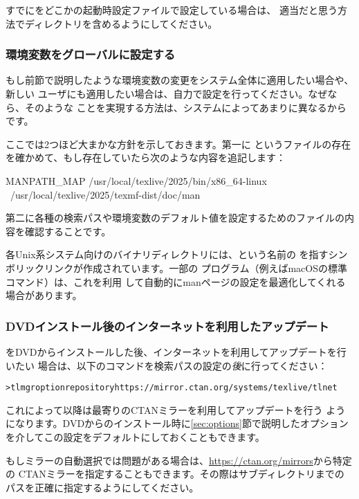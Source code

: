 \documentclass[uplatex,dvipdfmx,12pt,tombow]{jsarticle}
\begin{document}
すでにをどこかの起動時設定ファイルで設定している場合は、
適当だと思う方法で\TL ディレクトリを含めるようにしてください。

\subsubsection{環境変数をグローバルに設定する}
\label{sec:envglobal}

もし前節で説明したような環境変数の変更をシステム全体に適用したい場合や、新しい
ユーザにも適用したい場合は、自力で設定を行ってください。なぜなら、そのような
ことを実現する方法は、システムによってあまりに異なるからです。

ここでは2つほど大まかな方針を示しておきます。第一に%
というファイルの存在を確かめて、もし存在していたら次のような内容を追記します：
%
\begin{sverbatim}
MANPATH_MAP /usr/local/texlive/2025/bin/x86_64-linux \
            /usr/local/texlive/2025/texmf-dist/doc/man
\end{sverbatim}
%
第二に各種の検索パスや環境変数のデフォルト値を設定するためのファイルの内容を確認することです。

各Unix系システム向けのバイナリディレクトリには、という名前の
を指すシンボリックリンクが作成されています。一部の
プログラム（例えばmacOSの標準コマンド）は、これを利用
して自動的にmanページの設定を最適化してくれる場合があります。

\subsubsection{DVDインストール後のインターネットを利用したアップデート}
\label{sec:dvd-install-net-updates}

\TL をDVDからインストールした後、インターネットを利用してアップデートを行いたい
場合は、以下のコマンドを検索パスの設定の\emph{後}に行ってください：
%
\begin{alltt}
> tlmgr option repository https://mirror.ctan.org/systems/texlive/tlnet
\end{alltt}
%
これによって以降は最寄りのCTANミラーを利用してアップデートを行う
ようになります。DVDからのインストール時に\ref{sec:options}節で説明したオプション
を介してこの設定をデフォルトにしておくこともできます。

もしミラーの自動選択では問題がある場合は、\url{https://ctan.org/mirrors}から特定の
CTANミラーを指定することもできます。その際はサブディレクトリまでの
パスを正確に指定するようにしてください。
\end{document}
